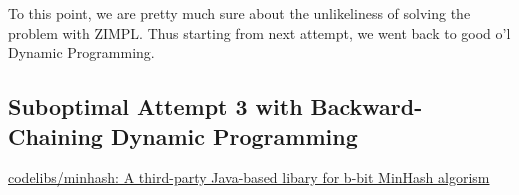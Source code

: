 \documentclass{article}
\begin{document}
To this point, we are pretty much sure about the unlikeliness of solving the problem with ZIMPL. Thus starting from next attempt, we went back to good o'l Dynamic Programming. 

\subsection{Suboptimal Attempt 3 with Backward-Chaining Dynamic Programming}








\begin{thebibliography}{9}
      \href{https://github.com/codelibs/minhash}{codelibs/minhash: A third-party Java-based libary  for b-bit MinHash algorism}


\end{thebibliography} %
\end{document}

